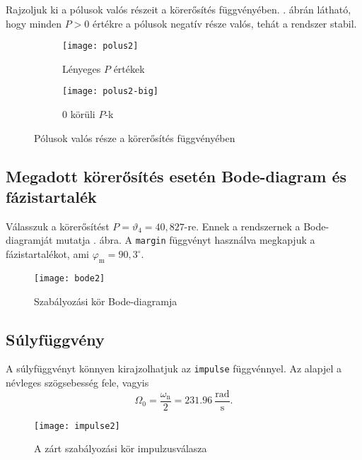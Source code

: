Rajzoljuk ki a pólusok valós részeit a körerősítés függvényében.
. ábrán látható, hogy minden $P>0$ értékre a pólusok
negatív része valós, tehát a rendszer stabil.
\begin{figure}[H]
	\centering
	\begin{subfigure}{.49\textwidth}
		\texttt{[image: polus2]}
		\caption{Lényeges $P$ értékek}
	\end{subfigure}
	\begin{subfigure}{.49\textwidth}
		\texttt{[image: polus2-big]}
		\caption{0 körüli $P$-k}
	\end{subfigure}
	\caption{Pólusok valós része a körerősítés függvényében}
	\label{fig:poles2}
\end{figure}


\subsection{Megadott körerősítés esetén Bode-diagram és fázistartalék}

Válasszuk a körerősítést $P=\vartheta_4 = 40,827$-re.
Ennek a rendszernek a Bode-diagramját mutatja . ábra.
A \verb|margin| függvényt használva megkapjuk a fázistartalékot,
ami $\varphi_\text{m}=90,3^\circ$.

\begin{figure}[H]
	\centering
	\texttt{[image: bode2]}
	\caption{Szabályozási kör Bode-diagramja}
	\label{fig:bode2}
\end{figure}


\subsection{Súlyfüggvény}

A súlyfüggvényt könnyen kirajzolhatjuk az \verb|impulse| függvénnyel. Az alapjel
a névleges szögsebesség fele, vagyis
\begin{equation}
	\Omega_0 = \frac{\omega_\text{n}}{2} = 231.96~\frac{\text{rad}}{\text{s}}.
\end{equation}

\begin{figure}[H]
	\centering
	\texttt{[image: impulse2]}
	\caption{A zárt szabályozási kör impulzusválasza}
	\label{fig:impulse2}
\end{figure}

